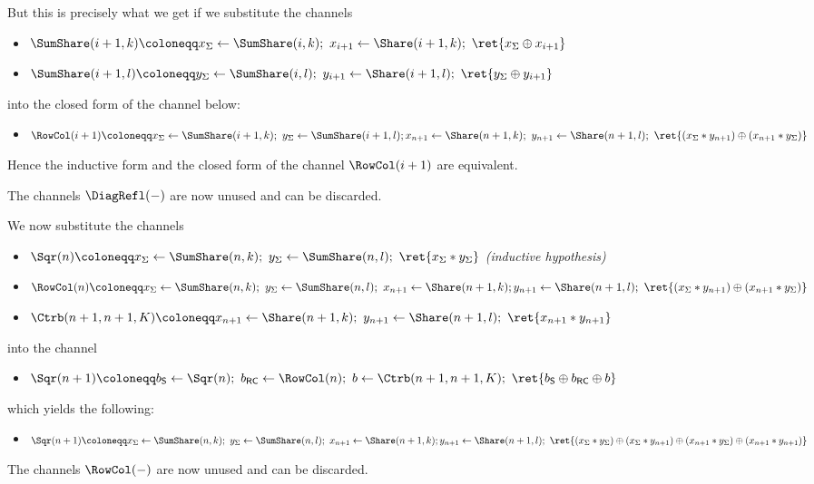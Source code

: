 \begin{itemize}
\begin{itemize}
\end{itemize}
But this is precisely what we get if we substitute the channels
\begin{itemize}
\item $\SumShare(i+1,k) \coloneqq x_\Sigma \leftarrow \SumShare(i,k); \ x_{i+1} \leftarrow \Share(i+1,k); \ \ret{x_\Sigma \oplus x_{i+1}}$
\item $\SumShare(i+1,l) \coloneqq y_\Sigma \leftarrow \SumShare(i,l); \ y_{i+1} \leftarrow \Share(i+1,l); \ \ret{y_\Sigma \oplus y_{i+1}}$
\end{itemize}
into the closed form of the channel below:
\begin{itemize}
\item $\RowCol(i+1) \coloneqq x_\Sigma \leftarrow \SumShare(i+1,k); \ y_\Sigma \leftarrow \SumShare(i+1,l); \\ x_{n+1} \leftarrow \Share(n+1,k); \ y_{n+1} \leftarrow \Share(n+1,l); \ \ret{(x_\Sigma * y_{n+1}) \oplus (x_{n+1} * y_\Sigma)}$
\end{itemize}
Hence the inductive form and the closed form of the channel $\RowCol(i+1)$ are equivalent.

The channels $\DiagRefl(-)$ are now unused and can be discarded.

We now substitute the channels
\begin{itemize}
\item $\Sqr(n) \coloneqq x_\Sigma \leftarrow \SumShare(n,k); \ y_\Sigma \leftarrow \SumShare(n,l); \ \ret{x_\Sigma * y_\Sigma}$ \emph{(inductive hypothesis)}
\item $\RowCol(n) \coloneqq x_\Sigma \leftarrow \SumShare(n,k); \ y_\Sigma \leftarrow \SumShare(n,l); \ x_{n+1} \leftarrow \Share(n+1,k); \\ y_{n+1} \leftarrow \Share(n+1,l); \ \ret{(x_\Sigma * y_{n+1}) \oplus (x_{n+1} * y_\Sigma)}$
\item $\Ctrb(n+1,n+1,K) \coloneqq x_{n+1} \leftarrow \Share(n+1,k); \ y_{n+1} \leftarrow \Share(n+1,l); \ \ret{x_{n+1} * y_{n+1}}$
\end{itemize}
into the channel
\begin{itemize}
\item $\Sqr(n+1) \coloneqq b_\mathsf{S} \leftarrow \Sqr(n); \ b_\mathsf{RC} \leftarrow \RowCol(n); \ b \leftarrow \Ctrb(n+1,n+1,K); \ \ret{b_\mathsf{S} \oplus b_\mathsf{RC} \oplus b}$
\end{itemize}
which yields the following:
\begin{itemize}
\item $\Sqr(n+1) \coloneqq x_\Sigma \leftarrow \SumShare(n,k); \ y_\Sigma \leftarrow \SumShare(n,l); \ x_{n+1} \leftarrow \Share(n+1,k); \\ y_{n+1} \leftarrow \Share(n+1,l); \ \ret{(x_\Sigma * y_\Sigma) \oplus (x_\Sigma * y_{n+1}) \oplus (x_{n+1} * y_\Sigma) \oplus (x_{n+1} * y_{n+1})}$
\end{itemize}
The channels $\RowCol(-)$ are now unused and can be discarded.


\end{itemize}
